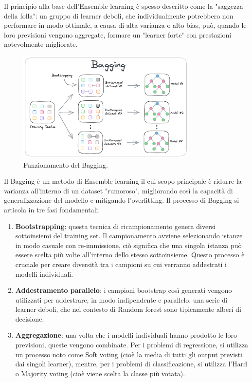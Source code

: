 \documentclass[a4paper,12pt]{report}
\begin{document}
	Il principio alla base dell'Ensemble learning è spesso descritto come la "saggezza della folla": un gruppo di learner deboli, che individualmente potrebbero non performare in modo ottimale, a causa di alta varianza o alto bias, può, quando le loro previsioni vengono aggregate, formare un "learner forte" con prestazioni notevolmente migliorate. \\
	\begin{figure}[H]
		\centering
		\includegraphics[width=0.8\textwidth]{img/bagging.png}
		\caption{Funzionamento del Bagging.}
	\end{figure}
	Il Bagging è un metodo di Ensemble learning il cui scopo principale è ridurre la varianza all'interno di un dataset "rumoroso", migliorando così la capacità di generalizzazione del modello e mitigando l'overfitting. Il processo di Bagging si articola in tre fasi fondamentali:
	\begin{enumerate}
		\item \textbf{Bootstrapping}: questa tecnica di ricampionamento genera diversi sottoinsiemi del training set. Il campionamento avviene selezionando istanze in modo casuale con re-immissione, ciò significa che una singola istanza può essere scelta più volte all'interno dello stesso sottoinsieme. Questo processo è cruciale per creare diversità tra i campioni su cui verranno addestrati i modelli individuali.
		\item \textbf{Addestramento parallelo}: i campioni bootstrap così generati vengono utilizzati per addestrare, in modo indipendente e parallelo, una serie di learner deboli, che nel contesto di Random forest sono tipicamente alberi di decisione.
		\item \textbf{Aggregazione}: una volta che i modelli individuali hanno prodotto le loro previsioni, queste vengono combinate. Per i problemi di regressione, si utilizza un processo noto come Soft voting (cioè la media di tutti gli output previsti dai singoli learner), mentre, per i problemi di classificazione, si utilizza l'Hard o Majority voting (cioè viene scelta la classe più votata).
	\end{enumerate}
	
\end{document}
